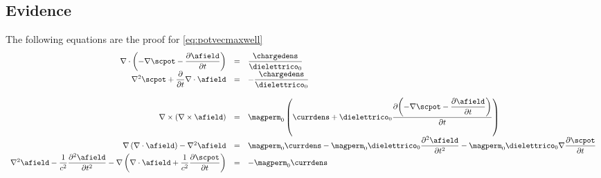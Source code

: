 \subsection{Evidence}

The following equations are the proof for \ref{eq:potvecmaxwell}
\begin{equation}
\begin{array}{rcl}
\nabla \cdot \left(  - \nabla \scpot - \partialtarg{\afield} \right) & = & \dfrac{\chargedens}{\dielettrico_0} \\
\nabla^2 \scpot + \partialt{\nabla \cdot \afield} & = & -\dfrac{\chargedens}{\dielettrico_0} \\
 & & \\
\nabla \times \left( \nabla \times \afield \right) & = & \magperm_0 \left( \currdens + \dielettrico_0 \partialtarg{\left(- \nabla \scpot - \partialtarg{\afield}\right)} \right) \\
\nabla \left( \nabla \cdot \afield \right) - \nabla^2 \afield & = & \magperm_0 \currdens - \magperm_0 \dielettrico_0 \dfrac{\partial^2 \afield}{\partial t^2} - \magperm_0 \dielettrico_0 \nabla \dfrac{\partial \scpot}{\partial t} \\
\nabla^2 \afield - \dfrac{1}{c^2} \dfrac{\partial^2 \afield}{\partial t^2} - \nabla \left( \nabla \cdot \afield + \dfrac{1}{c^2} \dfrac{\partial \scpot}{\partial t} \right) & = & - \magperm_0 \currdens
\end{array}
\label{eq:evidence1}
\end{equation}


